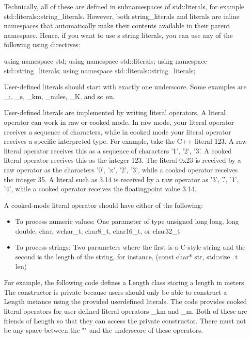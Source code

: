 Technically, all of these are defined in subnamespaces of std::literals, for example std::literals::string\_literals. However, both string\_literals and literals are inline namespaces that automatically make their contents available in their parent namespace. Hence, if you want to use s string literals, you can use any of the following using directives:

\begin{cpp}
using namespace std;
using namespace std::literals;
using namespace std::string_literals;
using namespace std::literals::string_literals;
\end{cpp}



User-defined literals should start with exactly one underscore. Some examples are \_i, \_s, \_km, \_miles, \_K, and so on.

User-defined literals are implemented by writing literal operators. A literal operator can work in raw or cooked mode. In raw mode, your literal operator receives a sequence of characters, while in cooked mode your literal operator receives a specific interpreted type. For example, take the C++ literal 123. A raw literal operator receives this as a sequence of characters '1', '2', '3'. A cooked literal operator receives this as the integer 123. The literal 0x23 is received by a raw operator as the characters '0', 'x', '2', '3', while a cooked operator receives the integer 35. A literal such as 3.14 is received by a raw operator as '3', '.', '1', '4', while a cooked operator receives the floatingpoint value 3.14.


A cooked-mode literal operator should have either of the following:

\begin{itemize}
\item
To process numeric values: One parameter of type unsigned long long, long double, char, wchar\_t, char8\_t, char16\_t, or char32\_t

\item
To process strings: Two parameters where the first is a C-style string and the second is the length of the string, for instance, (const char* str, std::size\_t len)
\end{itemize}

For example, the following code defines a Length class storing a length in meters. The constructor is private because users should only be able to construct a Length instance using the provided userdefined literals. The code provides cooked literal operators for user-defined literal operators \_km and \_m. Both of these are friends of Length so that they can access the private constructor. There must not be any space between the "" and the underscore of these operators.

